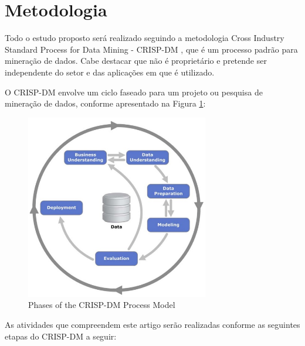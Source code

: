 \section{Metodologia}

Todo o estudo proposto será realizado seguindo a metodologia Cross Industry Standard Process for Data Mining - CRISP-DM \cite{chapman2000crisp}, que é um processo padrão para mineração de dados.  Cabe destacar que não é proprietário e pretende ser independente do setor e das aplicações em que é utilizado.

O CRISP-DM envolve um ciclo faseado para um projeto ou pesquisa de mineração de dados, conforme apresentado na Figura \ref{fig1}:

\begin{figure}[htbp]
	\centerline{
		\includegraphics[width=80mm,scale=0.8]{assets/crispdm.jpg}
	}
	\caption{Phases of the CRISP-DM Process Model}
	\label{fig1}
\end{figure}

As atividades que compreendem este artigo serão realizadas conforme as seguintes etapas do CRISP-DM a seguir:

